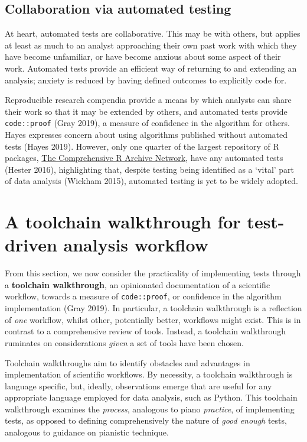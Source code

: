\documentclass[
]{article}
\begin{document}
\hypertarget{collaboration-via-automated-testing}{%
\subsection{Collaboration via automated
testing}\label{collaboration-via-automated-testing}}

At heart, automated tests are collaborative. This may be with others,
but applies at least as much to an analyst approaching their own past
work with which they have become unfamiliar, or have become anxious
about some aspect of their work. Automated tests provide an efficient
way of returning to and extending an analysis; anxiety is reduced by
having defined outcomes to explicitly code for.

Reproducible research compendia provide a means by which analysts can
share their work so that it may be extended by others, and automated
tests provide \texttt{code::proof} (Gray 2019), a measure of confidence
in the algorithm for others. Hayes expresses concern about using
algorithms published without automated tests (Hayes 2019). However, only
one quarter of the largest repository of R packages,
\href{https://cran.r-project.org/}{The Comprehensive R Archive Network},
have any automated tests (Hester 2016), highlighting that, despite
testing being identified as a `vital' part of data analysis (Wickham
2015), automated testing is yet to be widely adopted.

\hypertarget{a-toolchain-walkthrough-for-test-driven-analysis-workflow}{%
\section{A toolchain walkthrough for test-driven analysis
workflow}\label{a-toolchain-walkthrough-for-test-driven-analysis-workflow}}

From this section, we now consider the practicality of implementing
tests through a \textbf{toolchain walkthrough}, an opinionated
documentation of a scientific workflow, towards a measure of
\texttt{code::proof}, or confidence in the algorithm implementation
(Gray 2019). In particular, a toolchain walkthrough is a reflection of
\emph{one} workflow, whilst other, potentially better, workflows might
exist. This is in contrast to a comprehensive review of tools. Instead,
a toolchain walkthrough ruminates on considerations \emph{given} a set
of tools have been chosen.

Toolchain walkthroughs aim to identify obstacles and advantages in
implementation of scientific workflows. By necessity, a toolchain
walkthrough is language specific, but, ideally, observations emerge that
are useful for any appropriate language employed for data analysis, such
as Python. This toolchain walkthrough examines the \emph{process},
analogous to piano \emph{practice}, of implementing tests, as opposed to
defining comprehensively the nature of \emph{good enough} tests,
analogous to guidance on pianistic technique.
\end{document}
